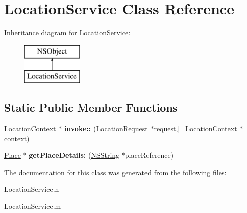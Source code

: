 \hypertarget{interface_location_service}{
\section{\-Location\-Service \-Class \-Reference}
\label{interface_location_service}
}
\-Inheritance diagram for \-Location\-Service\-:\begin{figure}[H]
\begin{center}
\leavevmode
\includegraphics[height=2.000000cm]{interface_location_service}
\end{center}
\end{figure}
\subsection*{\-Static \-Public \-Member \-Functions}
\begin{DoxyCompactItemize}
\item 
\hypertarget{interface_location_service_a08adf69c1ce72c8503595a061ec19d39}{
\hyperlink{interface_location_context}{\-Location\-Context} $\ast$ {\bfseries invoke\-::} (\hyperlink{interface_location_request}{\-Location\-Request} $\ast$request,\mbox{[}$\,$\mbox{]} \hyperlink{interface_location_context}{\-Location\-Context} $\ast$context)}
\label{interface_location_service_a08adf69c1ce72c8503595a061ec19d39}

\item 
\hypertarget{interface_location_service_a3b615a66cfe302e44bc4c04e4ba84d6c}{
\hyperlink{interface_place}{\-Place} $\ast$ {\bfseries get\-Place\-Details\-:} (\hyperlink{class_n_s_string}{\-N\-S\-String} $\ast$place\-Reference)}
\label{interface_location_service_a3b615a66cfe302e44bc4c04e4ba84d6c}

\end{DoxyCompactItemize}


\-The documentation for this class was generated from the following files\-:\begin{DoxyCompactItemize}
\item 
\-Location\-Service.\-h\item 
\-Location\-Service.\-m\end{DoxyCompactItemize}

